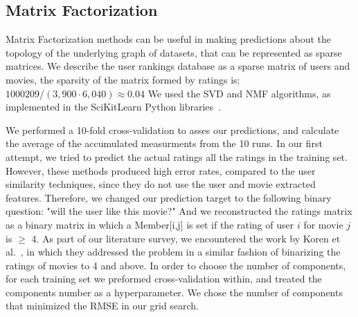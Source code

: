 \subsection{Matrix Factorization}

Matrix Factorization methods can be useful in making predictions about the topology of the underlying graph of datasets, that can be represented as sparse matrices.
We describe the user rankings database as a sparse matrix of users and movies, the sparsity of the matrix formed by ratings is: $1000209/(3,900 \cdot 6,040)\approx0.04$
We used the SVD and NMF algorithms, as implemented in the SciKitLearn Python libraries~\cite{pedregosa2011scikit}.

We performed a 10-fold cross-validation to asses our predictions, and calculate the average of the accumulated measurments from the 10 runs. 
In our first attempt, we tried to predict the actual ratings all the ratings in the training set. However, these methods produced high error rates, compared to the user similarity techniques, since they do not use the user and movie extracted features.
Therefore, we changed our prediction target to the following binary question: "will the user like this movie?"
And we reconstructed the ratings matrix as a binary matrix in which a Member[i,j] is set if the rating of user $i$ for movie $j$ is $\geq$ 4. As part of our literature survey, we encountered the work by Koren et al.~\cite{koren2009matrix}, in which they addressed the problem in a similar fashion of binarizing the ratings of movies to 4 and above. In order to choose the number of components, for each training set we preformed cross-validation within, and treated the components number as a hyperparameter. We chose the number of components that minimized the RMSE in our grid search.

